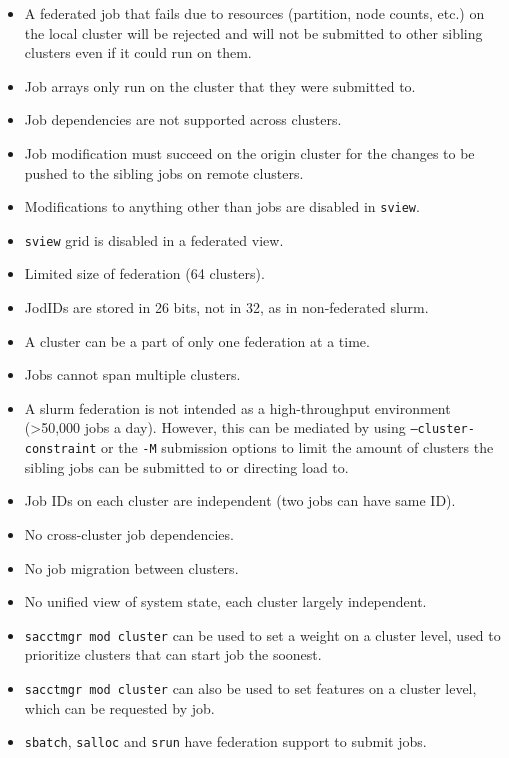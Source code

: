 \documentclass[conference]{IEEEtran}
\begin{document}
\begin{itemize}
    \item A federated job that fails due to resources (partition, node counts, etc.) on the local cluster will be rejected and will not be submitted to other sibling clusters even if it could run on them.
    \item Job arrays only run on the cluster that they were submitted to.
    \item Job dependencies are not supported across clusters.
    \item Job modification must succeed on the origin cluster for the changes to be pushed to the sibling jobs on remote clusters.
    \item Modifications to anything other than jobs are disabled in \texttt{sview}.
    \item \texttt{sview} grid is disabled in a federated view.
    \item Limited size of federation (64 clusters).
    \item JodIDs are stored in 26 bits, not in 32, as in non-federated \gls{slurm}.
    \item A cluster can be a part of only one federation at a time.
    \item Jobs cannot span multiple clusters.
    \item A \gls{slurm} federation is not intended as a high-throughput environment (\textgreater 50,000 jobs a day). However, this can be mediated by using \texttt{--cluster-constraint} or the \texttt{-M} submission options to limit the amount of clusters the sibling jobs can be submitted to or directing load to.
    \item Job IDs on each cluster are independent (two jobs can have same ID).
    \item No cross-cluster job dependencies.
    \item No job migration between clusters.
    \item No unified view of system state, each cluster largely independent.
    \item \texttt{sacctmgr mod cluster} can be used to set a weight on a cluster level, used to prioritize clusters that can start job the soonest.
    \item \texttt{sacctmgr mod cluster} can also be used to set features on a cluster level, which can be requested by job.
    \item \texttt{sbatch}, \texttt{salloc} and \texttt{srun} have federation support to submit jobs.
\end{itemize}
\end{document}
